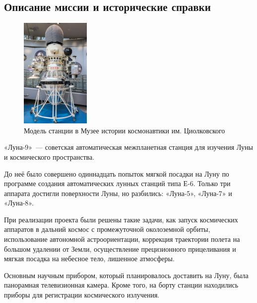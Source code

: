 \subsection{Описание миссии и исторические справки}
\begin{figure} %
	\centering
	\includegraphics[width=0.3\textwidth]{Luna_9_Space_Probe}
	\caption{Модель станции в Музее истории космонавтики им. Циолковского}
\end{figure}

\noindent «Луна-9» — советская автоматическая межпланетная станция для изучения Луны и космического пространства. 

\noindent До неё было совершено одиннадцать попыток мягкой посадки на Луну по программе создания автоматических лунных станций типа Е-6. Только три аппарата достигли поверхности Луны, но разбились: «Луна-5», «Луна-7» и «Луна-8».

\noindent При реализации проекта были решены такие задачи, как запуск космических аппаратов в дальний космос с промежуточной околоземной орбиты, использование автономной астроориентации, коррекция траектории полета на большом удалении от Земли, осуществление прецизионного прицеливания и мягкая посадка на небесное тело, лишенное атмосферы.

\noindent Основным научным прибором, который планировалось доставить на Луну, была панорамная телевизионная камера. Кроме того, на борту станции находились приборы для регистрации космического излучения.

